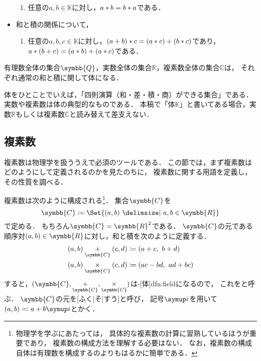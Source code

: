 \documentclass[../sotsu.tex]{subfiles}
\begin{document}
\begin{definition}[体]
\begin{itemize}
\begin{enumerate}[resume]
            \item \label{field:prod-commutative} 任意の$a, b \in 𝕂$に対し，$a \mathbin{\ast} b = b \mathbin{\ast} a$である．
        \end{enumerate}
        \item 和と積の関係について，
        \begin{enumerate}[resume]
            \item \label{field:distributive} 任意の$a, b, c \in 𝕂$に対し，$(a + b) \mathbin{\ast} c = (a \mathbin{\ast} c) + (b \mathbin{\ast} c)$であり，$a \mathbin{\ast} (b + c) = (a \mathbin{\ast} b) + (a \mathbin{\ast} c)$である．
        \end{enumerate}    
    \end{itemize}
\end{definition}

\begin{example}
    有理数全体の集合$\symbb{Q}$，実数全体の集合$ℝ$，複素数全体の集合$ℂ$は，
    それぞれ通常の和と積に関して体になる．
\end{example}

体をひとことでいえば，「四則演算（和・差・積・商）ができる集合」である．
実数や複素数は体の典型的なものである．
本稿で「体$𝕂$」と書いてある場合，実数$ℝ$もしくは複素数$ℂ$と読み替えて差支えない．



\subsection{複素数}

複素数は物理学を扱ううえで必須のツールである．
この節では，まず複素数はどのようにして定義されるのかを見たのちに，
複素数に関する用語を定義し，その性質を調べる．


複素数は次のように構成される\footnote{
    物理学を学ぶにあたっては，
    具体的な複素数の計算に習熟しているほうが重要であり，
    複素数の構成方法を理解する必要はない．
    なお，複素数の構成自体は有理数を構成するのよりもはるかに簡単である．
}．
集合$\symbb{C}$を
\begin{equation}
    \symbb{C} \coloneq \Set{  (a, b)  \given  a, b \in \symbb{R}  }
\end{equation}
で定める．
もちろん$\symbb{C} = \symbb{R}^2$である．
$\symbb{C}$の元である順序対$(a, b) \in \symbb{R}$に対し，和と積を次のように定義する．
\begin{align}
    (a, b) \underset{\symbb{C}}{+} (c, d) &\coloneq (a+c, \  b+d)  \\
    (a, b) \underset{\symbb{C}}{\times} (c, d) &\coloneq (ac-bd, \  ad+bc)
\end{align}
すると，$(\symbb{C}, \underset{\symbb{C}}{+}, \underset{\symbb{C}}{\times})$は-[体]{dfn:field}になるので，
これをと呼ぶ．
$\symbb{C}$の元を[ふく|そ|すう]と呼び，
記号$\iu$を用いて$(a, b) \eqcolon a + b\iu$とかく．
\end{document}
